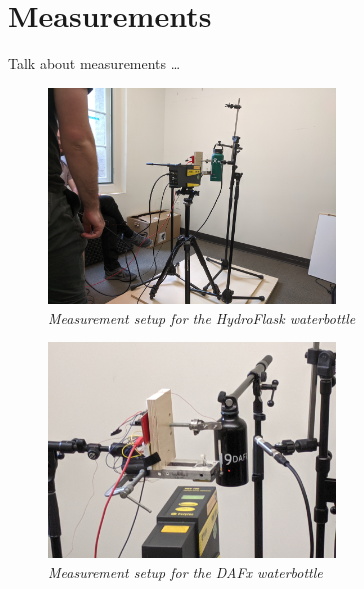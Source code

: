 \documentclass[twoside,a4paper]{article}
\begin{document}
\section{Measurements} \label{sec:measure}
%
Talk about measurements \dots
%
\begin{figure}[!htb]
    \centering
    \includegraphics[width=3in]{Figures/hydroflask_measure}
    \caption{\it{Measurement setup for the HydroFlask waterbottle}}
    \label{fig:hydro_measure}
\end{figure}
%
\begin{figure}[!htb]
    \centering
    \includegraphics[width=3in]{Figures/dafx_measure}
    \caption{\it{Measurement setup for the DAFx waterbottle}}
    \label{fig:dafx_measure}
\end{figure}
\end{document}
